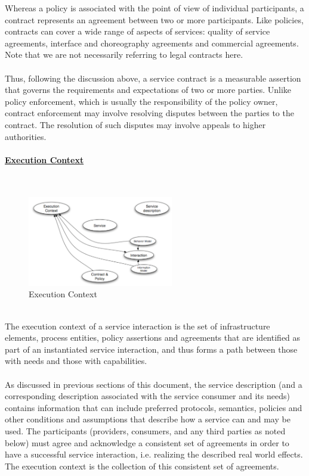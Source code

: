 \documentclass[10pt,a4paper]{article}
\newcommand{\myparagraph}[1]{\paragraph{\uline{#1}}\mbox{}\\[0.05in]}
\begin{document}
Whereas a policy is associated with the point of view of individual participants, a contract represents an agreement between two or more participants. Like policies, contracts can cover a wide range of aspects of services: quality of service agreements, interface and choreography agreements and commercial agreements. Note that we are not necessarily referring to legal contracts here. \\ \\
Thus, following the discussion above, a service contract is a measurable assertion that governs the requirements and expectations of two or more parties. Unlike policy enforcement, which is usually the responsibility of the policy owner, contract enforcement may involve resolving disputes between the parties to the contract. The resolution of such disputes may involve appeals to higher authorities.
\pagebreak
\myparagraph{Execution Context}
\begin{figure}[h!]
 \hfill \includegraphics[width=180pt]{images/execution-context}\hspace*{\fill}
  \caption{Execution Context}
  \label{fig:execution-context}
\end{figure} \\
The execution context of a service interaction is the set of infrastructure elements, process entities, policy assertions and agreements that are identified as part of an instantiated service interaction, and thus forms a path between those with needs and those with capabilities. \\ \\
As discussed in previous sections of this document, the service description (and a corresponding description associated with the service consumer and its needs) contains information that can include preferred protocols, semantics, policies and other conditions and assumptions that describe how a service can and may be used.
The participants (providers, consumers, and any third parties as noted below) must agree and acknowledge a consistent set of agreements in order to have a successful service interaction, i.e. realizing the described real world effects. The execution context is the collection of this consistent set of agreements. \\ \\
\end{document}
